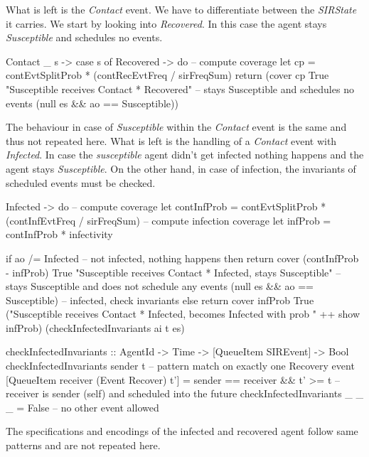 What is left is the \textit{Contact} event. We have to differentiate between the \textit{SIRState} it carries. We start by looking into \textit{Recovered}. In this case the agent stays \textit{Susceptible} and schedules no events. 

\begin{HaskellCode}
Contact _ s -> 
  case s of
    Recovered -> do
      -- compute coverage
      let cp = contEvtSplitProb * (contRecEvtFreq / sirFreqSum)
      return (cover cp True "Susceptible receives Contact * Recovered"
              -- stays Susceptible and schedules no events
              (null es && ao == Susceptible))
\end{HaskellCode}

The behaviour in case of \textit{Susceptible} within the \textit{Contact} event is the same and thus not repeated here. What is left is the handling of a \textit{Contact} event with \textit{Infected}. In case the \textit{susceptible} agent didn't get infected nothing happens and the agent stays \textit{Susceptible}. On the other hand, in case of infection, the invariants of scheduled events must be checked.

\begin{HaskellCode}
Infected -> do
  -- compute coverage
  let contInfProb = contEvtSplitProb * (contInfEvtFreq / sirFreqSum)
  -- compute infection coverage
  let infProb = contInfProb * infectivity

  if ao /= Infected
    -- not infected, nothing happens
    then return
          cover (contInfProb - infProb) True "Susceptible receives Contact * Infected, stays Susceptible"
            -- stays Susceptible and does not schedule any events 
            (null es && ao == Susceptible) 
    -- infected, check invariants
    else return 
          cover infProb True ("Susceptible receives Contact * Infected, becomes Infected with prob " ++ show infProb)
            (checkInfectedInvariants ai t es)
            
checkInfectedInvariants :: AgentId -> Time -> [QueueItem SIREvent] -> Bool
checkInfectedInvariants sender t 
    -- pattern match on exactly one Recovery event
    [QueueItem receiver (Event Recover) t'] 
  = sender == receiver && t' >= t           -- receiver is sender (self) and scheduled into the future
checkInfectedInvariants _ _ _ = False       -- no other event allowed
\end{HaskellCode}

The specifications and encodings of the infected and recovered agent follow same patterns and are not repeated here.


